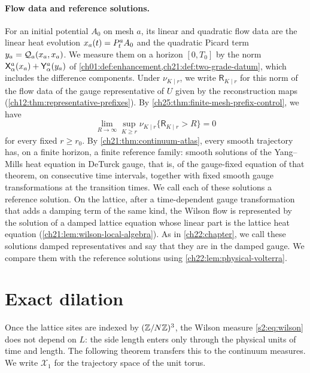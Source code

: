\paragraph{Flow data and reference solutions.}
For an initial potential $A_0$ on mesh $a$, its linear and quadratic flow data are the linear heat evolution $x_a(t)=P_{t}^{a} A_0$ and the quadratic Picard term $y_a=\mathcal Q_{a}(x_a,x_a)$. We measure them on a horizon $[0,T_0]$ by the norm $\mathsf X_{\alpha}^{a}(x_a)+\mathsf Y_{\alpha}^{a}(y_a)$ of \cref{ch01:def:enhancement,ch21:def:two-grade-datum}, which includes the difference components. Under $\nu_{K\mid r}$, we write $\mathsf R_{K\mid r}$ for this norm of the flow data of the gauge representative of $U$ given by the reconstruction maps (\cref{ch12:thm:representative-prefixes}). By \cref{ch25:thm:finite-mesh-prefix-control}, we have
\begin{equation}\label{ch26:eq:properties-radius-tightness}
 \lim_{R\to\infty}\sup_{K\ge r}\nu_{K\mid r}\{\mathsf R_{K\mid r}>R\}=0
\end{equation}
for every fixed $r\ge r_0$. By \cref{ch21:thm:continuum-atlas}, every smooth trajectory has, on a finite horizon, a finite reference family: smooth solutions of the Yang--Mills heat equation in DeTurck gauge, that is, of the gauge-fixed equation of that theorem, on consecutive time intervals, together with fixed smooth gauge transformations at the transition times. We call each of these solutions a reference solution. On the lattice, after a time-dependent gauge transformation that adds a damping term of the same kind, the Wilson flow is represented by the solution of a damped lattice equation whose linear part is the lattice heat equation (\cref{ch21:lem:wilson-local-algebra}). As in \cref{ch22:chapter}, we call these solutions damped representatives and say that they are in the damped gauge. We compare them with the reference solutions using \cref{ch22:lem:physical-volterra}.

\section{Exact dilation}\label{ch26:sec:dilation}

Once the lattice sites are indexed by $(\mathbb Z/N\mathbb Z)^3$, the Wilson measure \eqref{s2:eq:wilson} does not depend on $L$: the side length enters only through the physical units of time and length. The following theorem transfers this to the continuum measures. We write $\mathcal X_1$ for the trajectory space of the unit torus.

